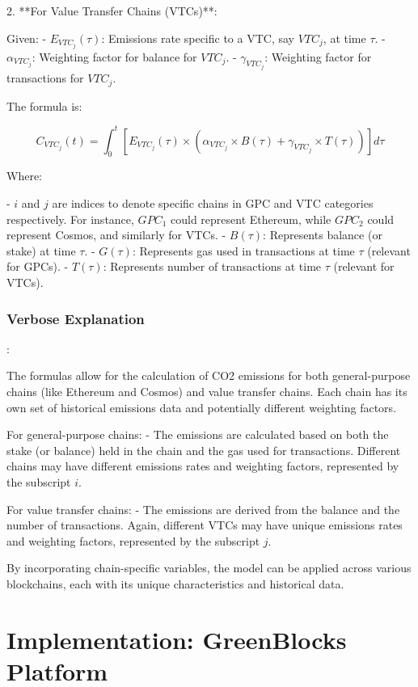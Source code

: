 \documentclass[12pt]{article}
\begin{document}
2. **For Value Transfer Chains (VTCs)**:

Given:
- \( E_{VTC_j}(\tau) \): Emissions rate specific to a VTC, say \( VTC_j \), at time \( \tau \).
- \( \alpha_{VTC_j} \): Weighting factor for balance for \( VTC_j \).
- \( \gamma_{VTC_j} \): Weighting factor for transactions for \( VTC_j \).

The formula is:

\[ C_{VTC_j}(t) = \int_{0}^{t} [E_{VTC_j}(\tau) \times (\alpha_{VTC_j} \times B(\tau) + \gamma_{VTC_j} \times T(\tau))] d\tau \]

Where:

- \( i \) and \( j \) are indices to denote specific chains in GPC and VTC categories respectively. For instance, \( GPC_1 \) could represent Ethereum, while \( GPC_2 \) could represent Cosmos, and similarly for VTCs.
- \( B(\tau) \): Represents balance (or stake) at time \( \tau \).
- \( G(\tau) \): Represents gas used in transactions at time \( \tau \) (relevant for GPCs).
- \( T(\tau) \): Represents number of transactions at time \( \tau \) (relevant for VTCs).

\subsubsection{Verbose Explanation}:

The formulas allow for the calculation of CO2 emissions for both general-purpose chains (like Ethereum and Cosmos) and value transfer chains. Each chain has its own set of historical emissions data and potentially different weighting factors. 

For general-purpose chains:
- The emissions are calculated based on both the stake (or balance) held in the chain and the gas used for transactions. Different chains may have different emissions rates and weighting factors, represented by the subscript \( i \).

For value transfer chains:
- The emissions are derived from the balance and the number of transactions. Again, different VTCs may have unique emissions rates and weighting factors, represented by the subscript \( j \).

By incorporating chain-specific variables, the model can be applied across various blockchains, each with its unique characteristics and historical data.



\section{Implementation: GreenBlocks Platform}
\end{document}
